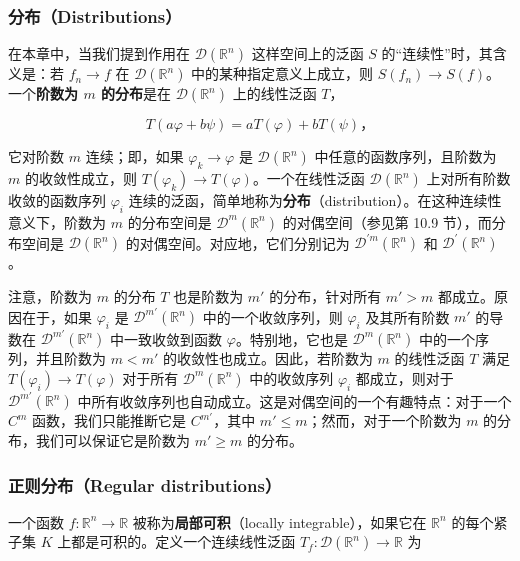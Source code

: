 \subsubsection{分布（Distributions）}\label{ux5206ux5e03distributions}

在本章中，当我们提到作用在 \(\mathcal{D}(\mathbb{R}^n)\)
这样空间上的泛函 \(S\) 的``连续性''时，其含义是：若 \(f_n \to f\) 在
\(\mathcal{D}(\mathbb{R}^n)\) 中的某种指定意义上成立，则
\(S(f_n) \to S(f)\)。一个\textbf{阶数为 \(m\) 的分布}是在
\(\mathcal{D}(\mathbb{R}^n)\) 上的线性泛函 \(T\)，

\[
T(a\varphi + b\psi) = aT(\varphi) + bT(\psi)，
\]

它对阶数 \(m\) 连续；即，如果 \(\varphi_k \to \varphi\) 是
\(\mathcal{D}(\mathbb{R}^n)\) 中任意的函数序列，且阶数为 \(m\)
的收敛性成立，则 \(T(\varphi_k) \to T(\varphi)\)。一个在线性泛函
\(\mathcal{D}(\mathbb{R}^n)\) 上对所有阶数收敛的函数序列 \(\varphi_i\)
连续的泛函，简单地称为\textbf{分布}（distribution）。在这种连续性意义下，阶数为
\(m\) 的分布空间是 \(\mathcal{D}^m(\mathbb{R}^n)\) 的对偶空间（参见第
10.9 节），而分布空间是 \(\mathcal{D}(\mathbb{R}^n)\)
的对偶空间。对应地，它们分别记为
\(\mathcal{D}^{\prime m}(\mathbb{R}^n)\) 和
\(\mathcal{D}^{\prime}(\mathbb{R}^n)\)。

注意，阶数为 \(m\) 的分布 \(T\) 也是阶数为 \(m'\) 的分布，针对所有
\(m' > m\) 都成立。原因在于，如果 \(\varphi_i\) 是
\(\mathcal{D}^{m'}(\mathbb{R}^n)\) 中的一个收敛序列，则 \(\varphi_i\)
及其所有阶数 \(m'\) 的导数在 \(\mathcal{D}^{m'}(\mathbb{R}^n)\)
中一致收敛到函数 \(\varphi\)。特别地，它也是
\(\mathcal{D}^m(\mathbb{R}^n)\) 中的一个序列，并且阶数为 \(m < m'\)
的收敛性也成立。因此，若阶数为 \(m\) 的线性泛函 \(T\) 满足
\(T(\varphi_i) \to T(\varphi)\) 对于所有 \(\mathcal{D}^m(\mathbb{R}^n)\)
中的收敛序列 \(\varphi_i\) 都成立，则对于
\(\mathcal{D}^{m'}(\mathbb{R}^n)\)
中所有收敛序列也自动成立。这是对偶空间的一个有趣特点：对于一个 \(C^m\)
函数，我们只能推断它是 \(C^{m'}\)，其中
\(m' \leq m\)；然而，对于一个阶数为 \(m\) 的分布，我们可以保证它是阶数为
\(m' \geq m\) 的分布。

\subsubsection{正则分布（Regular
distributions）}\label{ux6b63ux5219ux5206ux5e03regular-distributions}

一个函数 \(f: \mathbb{R}^n \to \mathbb{R}\)
被称为\textbf{局部可积}（locally integrable），如果它在 \(\mathbb{R}^n\)
的每个紧子集 \(K\) 上都是可积的。定义一个连续线性泛函
\(T_f: \mathcal{D}(\mathbb{R}^n) \to \mathbb{R}\) 为

